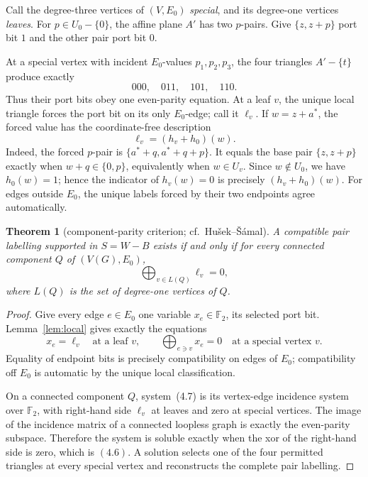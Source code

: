 \documentclass[11pt]{article}
\newtheorem{theorem}{Theorem}[section]
\theoremstyle{definition}
\theoremstyle{remark}
\newcommand{\F}{\mathbb F}
\newcommand{\1}{\mathbf 1}
\newcommand{\bigxor}{\bigoplus}
\begin{document}
Call the degree-three vertices of \((V,E_0)\) \emph{special}, and its
degree-one vertices \emph{leaves}.  For \(p\in U_0-\{0\}\), the affine
plane \(A'\) has two \(p\)-pairs.  Give \(\{z,z+p\}\) port bit \(1\) and
the other pair port bit \(0\).

At a special vertex with incident \(E_0\)-values \(p_1,p_2,p_3\), the four
triangles \(A'-\{t\}\) produce exactly
\[
 000,\quad011,\quad101,\quad110.                          \tag{4.4}
\]
Thus their port bits obey one even-parity equation.  At a leaf \(v\), the
unique local triangle forces the port bit on its only \(E_0\)-edge; call
it \(\ell_v\).  If \(w=z+a^*\), the forced value has the coordinate-free
description
\[
 \ell_v=(h_v+h_0)(w).                                     \tag{4.5}
\]
Indeed, the forced \(p\)-pair is
\(\{a^*+q,a^*+q+p\}\).  It equals the base pair
\(\{z,z+p\}\) exactly when \(w+q\in\{0,p\}\), equivalently when
\(w\in U_v\).  Since \(w\notin U_0\), we have \(h_0(w)=1\); hence the
indicator of \(h_v(w)=0\) is precisely \((h_v+h_0)(w)\).
For edges outside \(E_0\), the unique labels forced by their two endpoints
agree automatically.

\begin{theorem}[component-parity criterion; cf.\
Hu\v{s}ek--\v{S}\'amal]\label{thm:component}
A compatible pair labelling supported in \(S=W-B\) exists if and only if
for every connected component \(Q\) of \((V(G),E_0)\),
\[
 \bigxor_{v\in L(Q)}\ell_v=0,                             \tag{4.6}
\]
where \(L(Q)\) is the set of degree-one vertices of \(Q\).
\end{theorem}

\begin{proof}
Give every edge \(e\in E_0\) one variable \(x_e\in\F_2\), its selected
port bit.  Lemma~\ref{lem:local} gives exactly the equations
\[
 x_e=\ell_v\quad\text{at a leaf }v,\qquad
 \bigxor_{e\ni v}x_e=0\quad\text{at a special vertex }v.   \tag{4.7}
\]
Equality of endpoint bits is precisely compatibility on edges of \(E_0\);
compatibility off \(E_0\) is automatic by the unique local classification.

On a connected component \(Q\), system~(4.7) is its vertex-edge incidence
system over \(\F_2\), with right-hand side \(\ell_v\) at leaves and zero
at special vertices.  The image of the incidence matrix of a connected
loopless graph is exactly the even-parity subspace.  Therefore the system
is soluble exactly when the xor of the right-hand side is zero, which is
\((4.6)\).  A solution selects one of the four permitted triangles at
every special vertex and reconstructs the complete pair labelling.
\end{proof}
\end{document}
